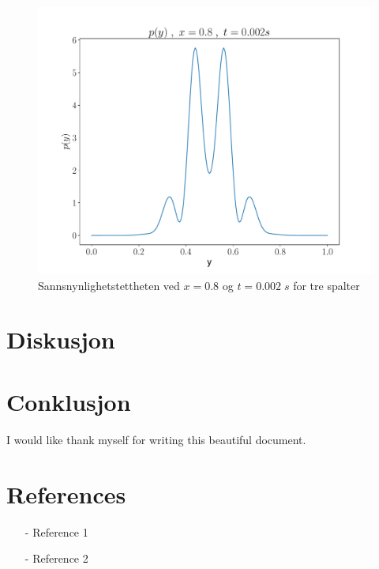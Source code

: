 \documentclass[reprint,english,notitlepage]{revtex4-2}  %
\begin{document}
\begin{figure}
\centering
\includegraphics[scale=0.4]{../Images/ScreenProb3Slit.pdf}
\caption{Sannsnynlighetstettheten ved $x = 0.8$ og $t = 0.002 \; s$ for tre spalter}
\label{Fig:Ps1}
\end{figure}

\section{Diskusjon}
\section{Conklusjon}
\begin{acknowledgments}  %
I would like thank myself for writing this beautiful document.
\end{acknowledgments}


\section*{References}  %
\begin{itemize}
\item[-]Reference 1
\item[-]Reference 2
\end{itemize}
\end{document}
